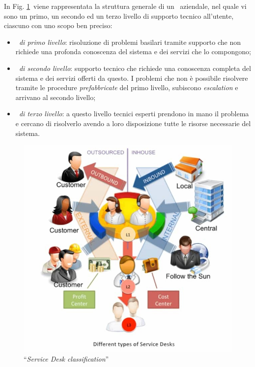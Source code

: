 	In Fig. \ref{fig:service-desk-types}~viene rappresentata la struttura generale di un \helpdesk~aziendale, nel quale vi sono un primo, un secondo ed un terzo livello di supporto tecnico all’utente, ciascuno con uno scopo ben preciso:
	\begin{itemize}[noitemsep]
		\item \textit{\helpdesk~di primo livello}: risoluzione di problemi basilari tramite supporto che non richiede una profonda conoscenza del sistema e dei servizi che lo compongono;
		\item \textit{\helpdesk~di secondo livello}: supporto tecnico che richiede una conoscenza completa del sistema e dei servizi offerti da questo. 
		I problemi che non è possibile risolvere tramite le procedure \textit{prefabbricate} del primo livello, subiscono \textit{escalation} e arrivano al secondo livello;
		\item \textit{\helpdesk~di terzo livello}: a questo livello tecnici esperti prendono in mano il problema e cercano di risolverlo avendo a loro disposizione tutte le risorse necessarie del sistema.
	\end{itemize}

	\begin{figure}[h!]
		\centering
		\includegraphics[width=\linewidth]{img/service-desk-types.jpg}
		\caption{``\textit{Service Desk classification}''\cite{service_desk}}
		\label{fig:service-desk-types}
	\end{figure}
	
